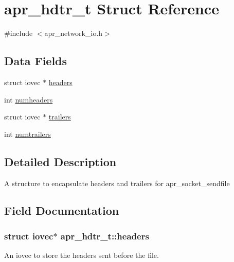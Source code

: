 \hypertarget{structapr__hdtr__t}{}\section{apr\+\_\+hdtr\+\_\+t Struct Reference}
\label{structapr__hdtr__t}


{\ttfamily \#include $<$apr\+\_\+network\+\_\+io.\+h$>$}

\subsection*{Data Fields}
\begin{DoxyCompactItemize}
\item 
struct iovec $\ast$ \hyperlink{structapr__hdtr__t_afc2035a3ef314f9aa6ae3aabe7c0dc72}{headers}
\item 
int \hyperlink{structapr__hdtr__t_a8915ade68ef06f4d23005ec0f81e9305}{numheaders}
\item 
struct iovec $\ast$ \hyperlink{structapr__hdtr__t_a538387cfa0065abc2bfa6ba7393fa3ee}{trailers}
\item 
int \hyperlink{structapr__hdtr__t_a9468659de891a5672b0b84cf442e9c7b}{numtrailers}
\end{DoxyCompactItemize}


\subsection{Detailed Description}
A structure to encapsulate headers and trailers for apr\+\_\+socket\+\_\+sendfile 

\subsection{Field Documentation}
\subsubsection[{\texorpdfstring{headers}{headers}}]{\setlength{\rightskip}{0pt plus 5cm}struct iovec$\ast$ apr\+\_\+hdtr\+\_\+t\+::headers}\hypertarget{structapr__hdtr__t_afc2035a3ef314f9aa6ae3aabe7c0dc72}{}\label{structapr__hdtr__t_afc2035a3ef314f9aa6ae3aabe7c0dc72}
An iovec to store the headers sent before the file. 
